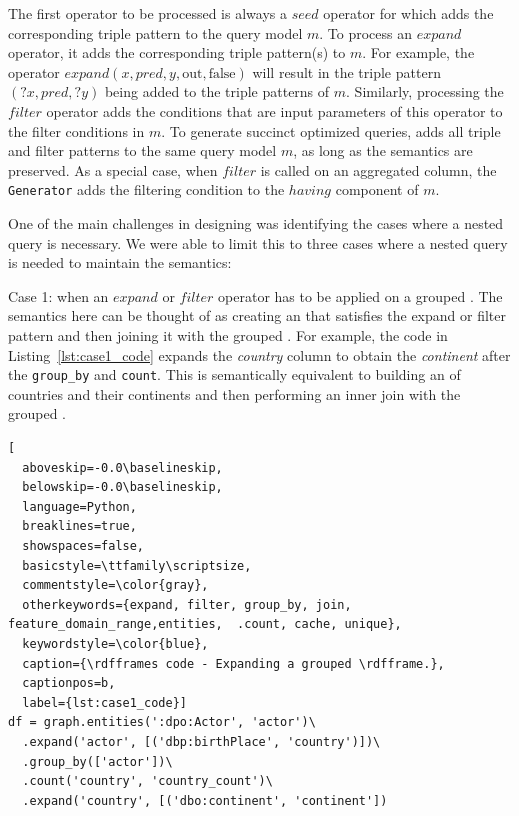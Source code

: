 The first operator to be processed is always a $seed$ operator for which \rdfframes adds the corresponding triple pattern to the query model $m$. 
To process an $expand$ operator, it adds the corresponding triple pattern(s) to $m$. For example, the operator $expand(x, pred, y, \text{out}, \text{false})$ will result in the triple pattern $(?x, pred, ?y)$ being added to the triple patterns of $m$. Similarly, processing the $filter$ operator adds the conditions that are input parameters of this operator to the filter conditions in $m$.
To generate succinct optimized queries,  \rdfframes adds all triple and filter patterns to the same query model $m$, as long as the semantics are preserved. %
As a special case, when $filter$ is called on an aggregated column, the \texttt{Generator} adds the filtering condition to the $having$ component of $m$. 

One of the main challenges 
in designing \rdfframes was identifying the cases where a nested \sparql query is necessary. We were able to limit this to %
three cases where a nested query is needed to maintain the semantics:
\squishlist
    \item Case 1: when an $expand$ or $filter$ operator has to be applied on a grouped \rdfframe. The semantics here can be thought of as creating an \rdfframe that satisfies the expand or filter pattern and then joining it with the grouped \rdfframe. For example, the \rdfframes code in Listing~\ref{lst:case1_code} expands the \textit{country} column to obtain the \textit{continent} after the \texttt{group\_by} and \texttt{count}. This is semantically equivalent to building an \rdfframe of countries and their continents and then performing an inner join with the grouped \rdfframe.
    \vspace{8pt}
\begin{lstlisting}[
  aboveskip=-0.0\baselineskip,
  belowskip=-0.0\baselineskip,
  language=Python,
  breaklines=true,
  showspaces=false,
  basicstyle=\ttfamily\scriptsize,
  commentstyle=\color{gray},
  otherkeywords={expand, filter, group_by, join, feature_domain_range,entities,  .count, cache, unique},
  keywordstyle=\color{blue},
  caption={\rdfframes code - Expanding a grouped \rdfframe.},
  captionpos=b,
  label={lst:case1_code}]
df = graph.entities(':dpo:Actor', 'actor')\
  .expand('actor', [('dbp:birthPlace', 'country')])\
  .group_by(['actor'])\
  .count('country', 'country_count')\
  .expand('country', [('dbo:continent', 'continent'])
\end{lstlisting}

